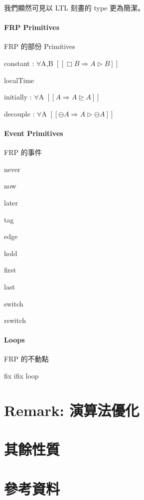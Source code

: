 \documentclass{article}
\newcommand{\llens}{[\![}
\newcommand{\rlens}{]\!]}
\begin{document}
  我們顯然可見以 LTL 刻畫的 type 更為簡潔。

  \paragraph{FRP Primitives} FRP 的部份 Primitives
  \begin{code}
  constant : $\forall${A,B} $\llens \Box B\Rightarrow A\rhd B\rlens$

  localTime

  initially : $\forall${A} $\llens A\Rightarrow A\unrhd A\rlens$

  decouple : $\forall${A} $\llens\ominus A\Rightarrow A\rhd \ominus A\rlens$
  \end{code}
  \paragraph{Event Primitives} FRP 的事件
  \begin{code}
  never

  now

  later

  tag

  edge

  hold

  first

  last

  switch

  rswitch
  \end{code}
  \paragraph{Loops} FRP 的不動點
  \begin{code}
  fix
  ifix
  loop
  \end{code}

\section{Remark: 演算法優化}
\section{其餘性質}
\section{參考資料}
\end{document}
